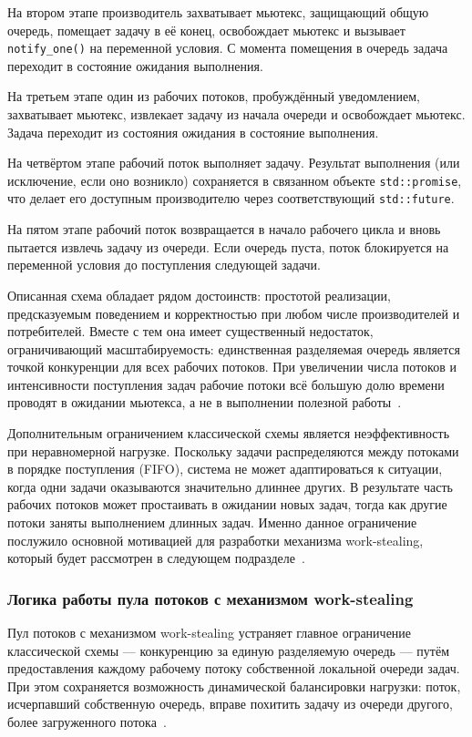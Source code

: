 На втором этапе производитель захватывает мьютекс, защищающий
общую очередь, помещает задачу в её конец, освобождает мьютекс
и вызывает \texttt{notify\_one()} на переменной условия.
С момента помещения в очередь задача переходит в состояние
ожидания выполнения.

На третьем этапе один из рабочих потоков, пробуждённый
уведомлением, захватывает мьютекс, извлекает задачу из начала
очереди и освобождает мьютекс. Задача переходит из состояния
ожидания в состояние выполнения.

На четвёртом этапе рабочий поток выполняет задачу. Результат
выполнения (или исключение, если оно возникло) сохраняется
в связанном объекте \texttt{std::promise}, что делает его
доступным производителю через соответствующий \texttt{std::future}.

На пятом этапе рабочий поток возвращается в начало рабочего
цикла и вновь пытается извлечь задачу из очереди. Если очередь
пуста, поток блокируется на переменной условия до поступления
следующей задачи.

Описанная схема обладает рядом достоинств: простотой реализации,
предсказуемым поведением и корректностью при любом числе
производителей и потребителей. Вместе с тем она имеет
существенный недостаток, ограничивающий масштабируемость:
единственная разделяемая очередь является точкой конкуренции
для всех рабочих потоков. При увеличении числа потоков
и интенсивности поступления задач рабочие потоки всё большую
долю времени проводят в ожидании мьютекса, а не в выполнении
полезной работы~\cite{Herlihy2020}.

Дополнительным ограничением классической схемы является
неэффективность при неравномерной нагрузке. Поскольку задачи
распределяются между потоками в порядке поступления (FIFO),
система не может адаптироваться к ситуации, когда одни задачи
оказываются значительно длиннее других. В результате часть
рабочих потоков может простаивать в ожидании новых задач,
тогда как другие потоки заняты выполнением длинных задач.
Именно данное ограничение послужило основной мотивацией для
разработки механизма work-stealing, который будет рассмотрен
в следующем подразделе~\cite{Williams2019}.

\subsubsection{Логика работы пула потоков с механизмом work-stealing}

Пул потоков с механизмом work-stealing устраняет главное
ограничение классической схемы --- конкуренцию за единую
разделяемую очередь --- путём предоставления каждому рабочему
потоку собственной локальной очереди задач. При этом сохраняется
возможность динамической балансировки нагрузки: поток, исчерпавший
собственную очередь, вправе похитить задачу из очереди другого,
более загруженного потока~\cite{Williams2019}.

